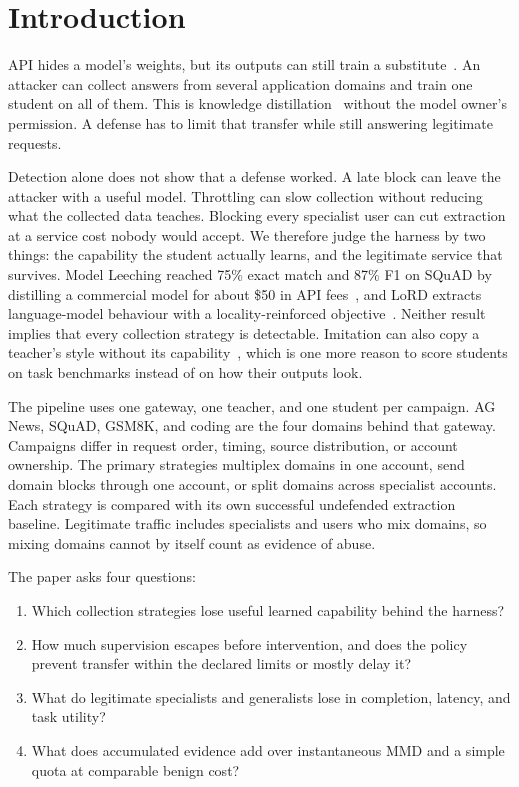 \documentclass[journal]{IEEEtran}
\begin{document}
\section{Introduction}
 API hides a model's weights, but its outputs can still train a substitute~\cite{tramer2016stealing,orekondy2019knockoff}. An attacker can collect answers from several application domains and train one student on all of them. This is knowledge distillation~\cite{hinton2015distilling,kim2016sequence} without the model owner's permission. A defense has to limit that transfer while still answering legitimate requests.

Detection alone does not show that a defense worked. A late block can leave the attacker with a useful model. Throttling can slow collection without reducing what the collected data teaches. Blocking every specialist user can cut extraction at a service cost nobody would accept. We therefore judge the harness by two things: the capability the student actually learns, and the legitimate service that survives. Model Leeching reached 75\% exact match and 87\% F1 on SQuAD by distilling a commercial model for about \$50 in API fees~\cite{birch2023leeching}, and LoRD extracts language-model behaviour with a locality-reinforced objective~\cite{liang2025lord}. Neither result implies that every collection strategy is detectable. Imitation can also copy a teacher's style without its capability~\cite{gudibande2024false}, which is one more reason to score students on task benchmarks instead of on how their outputs look.

The pipeline uses one gateway, one teacher, and one student per campaign. AG News, SQuAD, GSM8K, and coding are the four domains behind that gateway. Campaigns differ in request order, timing, source distribution, or account ownership. The primary strategies multiplex domains in one account, send domain blocks through one account, or split domains across specialist accounts. Each strategy is compared with its own successful undefended extraction baseline. Legitimate traffic includes specialists and users who mix domains, so mixing domains cannot by itself count as evidence of abuse.

The paper asks four questions:
\begin{enumerate}
	\item Which collection strategies lose useful learned capability behind the harness?
	\item How much supervision escapes before intervention, and does the policy prevent transfer within the declared limits or mostly delay it?
	\item What do legitimate specialists and generalists lose in completion, latency, and task utility?
	\item What does accumulated evidence add over instantaneous MMD and a simple quota at comparable benign cost?
\end{enumerate}
\end{document}
